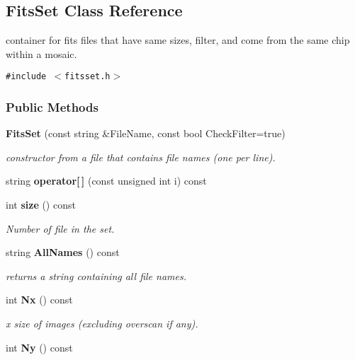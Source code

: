 \subsection{Fits\-Set  Class Reference}
\label{class_fitsset}
container for fits files that have same sizes, filter, and come from the same chip within a mosaic. 


{\tt \#include $<$fitsset.h$>$}

\subsubsection*{Public Methods}
\begin{CompactItemize}
\item 
{\bf Fits\-Set} (const string \&File\-Name, const bool Check\-Filter=true)
\begin{CompactList}\small\item\em constructor from a file that contains file names (one per line).\item\end{CompactList}\item 
{}
string {\bf operator[$\,$]} (const unsigned int i) const\label{class_fitsset_a1}

\item 
{}
int {\bf size} () const\label{class_fitsset_a2}

\begin{CompactList}\small\item\em Number of file in the set.\item\end{CompactList}\item 
{}
string {\bf All\-Names} () const\label{class_fitsset_a3}

\begin{CompactList}\small\item\em returns a string containing all file names.\item\end{CompactList}\item 
{}
int {\bf Nx} () const\label{class_fitsset_a4}

\begin{CompactList}\small\item\em x size of images (excluding overscan if any).\item\end{CompactList}\item 
{}
int {\bf Ny} () const\label{class_fitsset_a5}


\end{CompactItemize}
